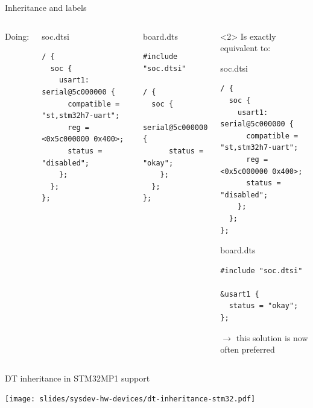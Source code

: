 \begin{frame}[fragile]{Inheritance and labels}

  \begin{columns}[t]
    Doing:
    \begin{block}{soc.dtsi}
      {\tiny
\begin{verbatim}
/ {
  soc {
    usart1: serial@5c000000 {
      compatible = "st,stm32h7-uart";
      reg = <0x5c000000 0x400>;
      status = "disabled";
    };
  };
};
\end{verbatim}
      }
    \end{block}

    \begin{block}{board.dts}
      {\tiny
\begin{verbatim}
#include "soc.dtsi"

/ {
  soc {
    serial@5c000000 {
      status = "okay";
    };
  };
};
\end{verbatim}
      }
    \end{block}

    \begin{onlyenv}<2>
    Is exactly equivalent to:

    \begin{block}{soc.dtsi}
      {\tiny
\begin{verbatim}
/ {
  soc {
    usart1: serial@5c000000 {
      compatible = "st,stm32h7-uart";
      reg = <0x5c000000 0x400>;
      status = "disabled";
    };
  };
};
\end{verbatim}
      }
    \end{block}

    \begin{block}{board.dts}
      {\tiny
\begin{verbatim}
#include "soc.dtsi"

&usart1 {
  status = "okay";
};
\end{verbatim}
        }
      \end{block}

      $\rightarrow$ this solution is now often preferred
      \end{onlyenv}
  \end{columns}

\end{frame}

\begin{frame}{DT inheritance in STM32MP1 support}
  \begin{center}
    \texttt{[image: slides/sysdev-hw-devices/dt-inheritance-stm32.pdf]}
  \end{center}
\end{frame}

